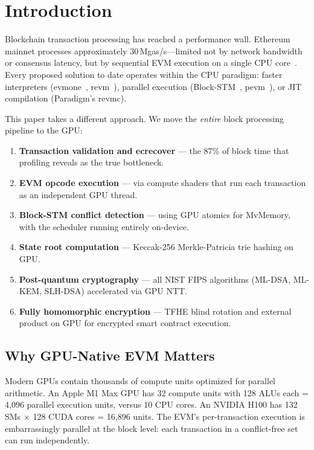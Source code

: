 \section{Introduction}

\label{sec:intro}

Blockchain transaction processing has reached a performance wall. Ethereum mainnet
processes approximately 30\,Mgas/s---limited not by network bandwidth or consensus
latency, but by sequential EVM execution on a single CPU core~\cite{pevm}. Every
proposed solution to date operates within the CPU paradigm: faster interpreters
(evmone~\cite{evmone}, revm~\cite{reth}), parallel execution (Block-STM~\cite{blockstm},
pevm~\cite{pevm}), or JIT compilation (Paradigm's revmc).

This paper takes a different approach. We move the \emph{entire} block processing
pipeline to the GPU:

\begin{enumerate}
\item \textbf{Transaction validation and ecrecover} --- the 87\% of block time that
      profiling reveals as the true bottleneck.
\item \textbf{EVM opcode execution} --- via compute shaders that run each transaction
      as an independent GPU thread.
\item \textbf{Block-STM conflict detection} --- using GPU atomics for MvMemory, with
      the scheduler running entirely on-device.
\item \textbf{State root computation} --- Keccak-256 Merkle-Patricia trie hashing on GPU.
\item \textbf{Post-quantum cryptography} --- all NIST FIPS algorithms (ML-DSA, ML-KEM,
      SLH-DSA) accelerated via GPU NTT.
\item \textbf{Fully homomorphic encryption} --- TFHE blind rotation and external product
      on GPU for encrypted smart contract execution.
\end{enumerate}

\subsection{Why GPU-Native EVM Matters}

Modern GPUs contain thousands of compute units optimized for parallel arithmetic. An
Apple M1 Max GPU has 32 compute units with 128 ALUs each = 4{,}096 parallel execution
units, versus 10 CPU cores. An NVIDIA H100 has 132 SMs $\times$ 128 CUDA cores = 16{,}896
units. The EVM's per-transaction execution is embarrassingly parallel at the block level:
each transaction in a conflict-free set can run independently.

